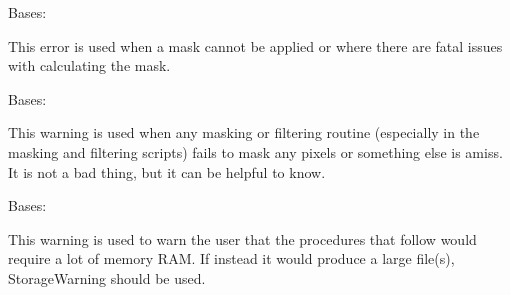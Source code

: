 \documentclass[letterpaper,10pt,english]{sphinxmanual}
\begin{document}

\begin{fulllineitems}
\label{\detokenize{docstrings/ifa_smeargle.core.error:ifa_smeargle.core.error.MaskingError}}
Bases: {\hyperref[\detokenize{docstrings/ifa_smeargle.core.error:ifa_smeargle.core.error.Ifas_Exception}]{}}

This error is used when a mask cannot be applied or where there
are fatal issues with calculating the mask.

\end{fulllineitems}


\begin{fulllineitems}
\label{\detokenize{docstrings/ifa_smeargle.core.error:ifa_smeargle.core.error.MaskingWarning}}
Bases: {\hyperref[\detokenize{docstrings/ifa_smeargle.core.error:ifa_smeargle.core.error.Ifas_Warning}]{}}

This warning is used when any masking or filtering routine
(especially in the masking and filtering scripts) fails to
mask any pixels or something else is amiss. It is not a bad
thing, but it can be helpful to know.

\end{fulllineitems}


\begin{fulllineitems}
\label{\detokenize{docstrings/ifa_smeargle.core.error:ifa_smeargle.core.error.MemoryWarning}}
Bases: {\hyperref[\detokenize{docstrings/ifa_smeargle.core.error:ifa_smeargle.core.error.Ifas_Warning}]{}}

This warning is used to warn the user that the procedures that
follow would require a lot of memory RAM. If instead it would
produce a large file(s), StorageWarning should be used.

\end{fulllineitems}
\end{document}
